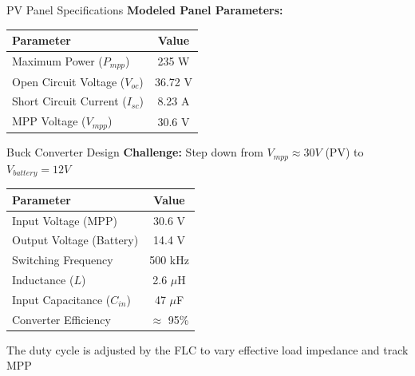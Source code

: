 \documentclass[aspectratio=169,usenames,dvipsnames]{beamer}
\begin{document}
\begin{frame}{PV Panel Specifications}
    \textbf{Modeled Panel Parameters:}
    
    \vspace{0.3cm}
    \begin{table}
        \centering
        \begin{tabular}{|l|c|}
            \hline
            \textbf{Parameter} & \textbf{Value} \\
            \hline
            Maximum Power ($P_{mpp}$) & 235 W \\
            \hline
            Open Circuit Voltage ($V_{oc}$) & 36.72 V \\
            \hline
            Short Circuit Current ($I_{sc}$) & 8.23 A \\
            \hline
            MPP Voltage ($V_{mpp}$) & 30.6 V \\
            \hline
        \end{tabular}
    \end{table}
\end{frame}

\begin{frame}{Buck Converter Design}
    \textbf{Challenge:} Step down from $V_{mpp} \approx 30V$ (PV) to $V_{battery} = 12V$
    
    \vspace{0.3cm}
    \begin{table}
        \centering
        \footnotesize
        \begin{tabular}{|l|c|}
            \hline
            \textbf{Parameter} & \textbf{Value} \\
            \hline
            Input Voltage (MPP) & 30.6 V \\
            \hline
            Output Voltage (Battery) & 14.4 V \\
            \hline
            Switching Frequency & 500 kHz \\
            \hline
            Inductance ($L$) & 2.6 $\mu$H \\
            \hline
            Input Capacitance ($C_{in}$) & 47 $\mu$F \\
            \hline
            Converter Efficiency & $\approx$ 95\% \\
            \hline
        \end{tabular}
    \end{table}
    
    \vspace{0.2cm}
    The duty cycle is adjusted by the FLC to vary effective load impedance and track MPP
\end{frame}
\end{document}

